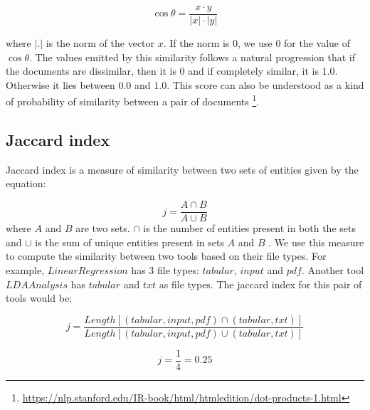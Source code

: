 \begin{equation}
\cos{\theta} = \frac {x \cdot y}{|x| \cdot |y|} 
\end{equation}

where $|.|$ is the norm of the vector $x$. If the norm is $0$, we use $0$ for the value of $\cos{\theta}$. The values emitted by this similarity follows a natural progression that if the documents are dissimilar, then it is $0$ and if completely similar, it is $1.0$. Otherwise it lies between $0.0$ and $1.0$. This score can also be understood as a kind of probability of similarity between a pair of documents \footnote{\url{https://nlp.stanford.edu/IR-book/html/htmledition/dot-products-1.html}}. 

\subsection{Jaccard index}
Jaccard index is a measure of similarity between two sets of entities given by the equation:

\begin{equation}
j = \frac{A \cap B}{A \cup B}
\end{equation}
where $A$ and $B$ are two sets. $\cap$ is the number of entities present in both the sets and $\cup$ is the sum of unique entities present in sets $A$ and $B$ \cite{Ivchenko1998}. We use this measure to compute the similarity between two tools based on their file types. For example, $LinearRegression$ has 3 file types: $tabular$, $input$ and $pdf$. Another tool $LDAAnalysis$ has $tabular$ and $txt$ as file types. The jaccard index for this pair of tools would be:

\begin{equation}
j = \frac{Length[(tabular, input, pdf) \cap (tabular, txt)]}{Length[(tabular, input, pdf) \cup (tabular, txt)]}
\end{equation}

\begin{equation}
j = \frac{1}{4} = 0.25
\end{equation}

